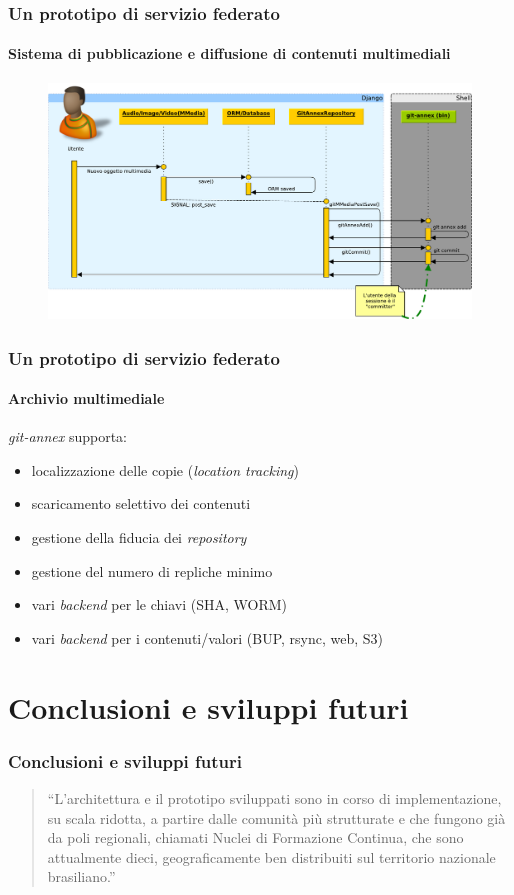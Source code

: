\documentclass{beamer}
\begin{document}
\begin{frame}
  \frametitle{Un prototipo di servizio federato}
  \framesubtitle{Sistema di pubblicazione e diffusione di contenuti multimediali}
	\begin{figure}
		\includegraphics[width=\textwidth]{./Figure/SequenceDiagram_NuovoOggetto-crop.pdf}
	\end{figure}
\end{frame}

\begin{frame}
  \frametitle{Un prototipo di servizio federato}
  \framesubtitle{Archivio multimediale}
\emph{git-annex} supporta:
\begin{itemize}
\item localizzazione delle copie (\emph{location tracking})
\item scaricamento selettivo dei contenuti
\item gestione della fiducia dei \emph{repository}
\item gestione del numero di repliche minimo
\item vari \emph{backend} per le chiavi (SHA, WORM)
\item vari \emph{backend} per i contenuti/valori (BUP, rsync, web, S3)
\end{itemize}

\end{frame}

\section{Conclusioni e sviluppi futuri}

\begin{frame}
 \frametitle{Conclusioni e sviluppi futuri}
  \begin{quote}
    ``L'architettura e il prototipo sviluppati sono in corso di
    implementazione, su scala ridotta, a partire dalle comunità più
    strutturate e che fungono già da poli regionali, chiamati Nuclei
    di Formazione Continua, che sono attualmente dieci,
    geograficamente ben distribuiti sul territorio nazionale
    brasiliano.''
  \end{quote}
\end{frame}
\end{document}
